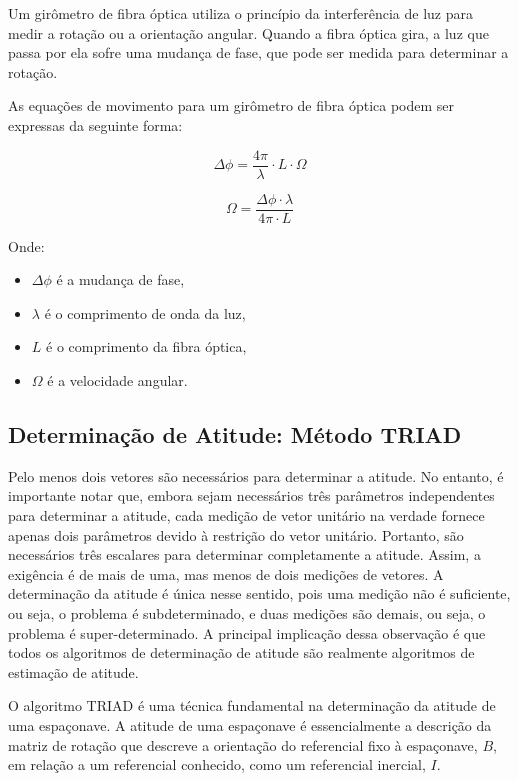 Um girômetro de fibra óptica utiliza o princípio da interferência de luz para medir a rotação ou a orientação angular. Quando a fibra óptica gira, a luz que passa por ela sofre uma mudança de fase, que pode ser medida para determinar a rotação.

As equações de movimento para um girômetro de fibra óptica podem ser expressas da seguinte forma:
 	
\begin{equation}
 		\Delta \phi = \frac{4 \pi}{\lambda} \cdot L \cdot \Omega
\end{equation}

\begin{equation}
	 		\Omega = \frac{\Delta \phi \cdot \lambda}{4 \pi \cdot L}
\end{equation}
 	
 	Onde:
 	
\begin{itemize}
 		\item $\Delta \phi$ é a mudança de fase,
 		\item $\lambda$ é o comprimento de onda da luz,
 		\item $L$ é o comprimento da fibra óptica,
 		\item $\Omega$ é a velocidade angular.
\end{itemize}
 

\subsection{Determinação de Atitude: Método TRIAD}\label{sec:3.1.5}

Pelo menos dois vetores são necessários para determinar a atitude. No entanto, é importante notar que, embora sejam necessários três parâmetros independentes para determinar a atitude, cada medição de vetor unitário na verdade fornece apenas dois parâmetros devido à restrição do vetor unitário. Portanto, são necessários três escalares para determinar completamente a atitude. Assim, a exigência é de mais de uma, mas menos de dois medições de vetores. A determinação da atitude é única nesse sentido, pois uma medição não é suficiente, ou seja, o problema é subdeterminado, e duas medições são demais, ou seja, o problema é super-determinado. A principal implicação dessa observação é que todos os algoritmos de determinação de atitude são realmente algoritmos de estimação de atitude.

O algoritmo TRIAD é uma técnica fundamental na determinação da atitude de uma espaçonave. A atitude de uma espaçonave é essencialmente a descrição da matriz de rotação que descreve a orientação do referencial fixo à espaçonave, $B$, em relação a um referencial conhecido, como um referencial inercial, $I$.

